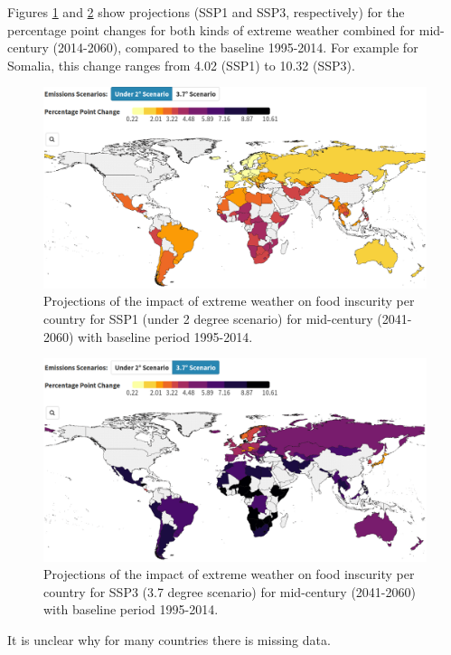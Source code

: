 \documentclass[
]{krantz}
\begin{document}
Figures \ref{fig:food2ssp1strobl} and \ref{fig:food2ssp3strobl} show projections (SSP1 and SSP3, respectively) for the percentage point changes for both kinds of extreme weather combined for mid-century (2014-2060), compared to the baseline 1995-2014. For example for Somalia, this change ranges from 4.02 (SSP1) to 10.32 (SSP3).

\begin{figure}

{\centering \includegraphics[width=0.8\linewidth]{work/08-lancet/figures/indicator_3_2} 

}

\caption{Projections of the impact of extreme weather on food inscurity per country for SSP1 (under 2 degree scenario) for mid-century (2041-2060) with baseline period 1995-2014.}\label{fig:food2ssp1strobl}
\end{figure}
\begin{figure}

{\centering \includegraphics[width=0.8\linewidth]{work/08-lancet/figures/indicator_3_3} 

}

\caption{Projections of the impact of extreme weather on food inscurity per country for SSP3 (3.7 degree scenario) for mid-century (2041-2060) with baseline period 1995-2014.}\label{fig:food2ssp3strobl}
\end{figure}

It is unclear why for many countries there is missing data.
\end{document}
